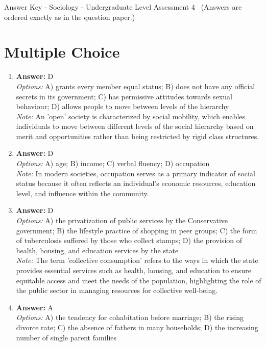\documentclass[12pt]{article}
\begin{document}
\begin{center}
Answer Key - Sociology - Undergraduate Level Assessment 4 \
\small (Answers are ordered exactly as in the question paper.)
\end{center}

\section*{Multiple Choice}
\begin{enumerate}[label=\arabic*.]
\item \textbf{Answer:} D
\\ \textit{Options:} A) grants every member equal status; B) does not have any official secrets in its government; C) has permissive attitudes towards sexual behaviour; D) allows people to move between levels of the hierarchy
\\ \textit{Note:} An 'open' society is characterized by social mobility, which enables individuals to move between different levels of the social hierarchy based on merit and opportunities rather than being restricted by rigid class structures.
\item \textbf{Answer:} D
\\ \textit{Options:} A) age; B) income; C) verbal fluency; D) occupation
\\ \textit{Note:} In modern societies, occupation serves as a primary indicator of social status because it often reflects an individual's economic resources, education level, and influence within the community.
\item \textbf{Answer:} D
\\ \textit{Options:} A) the privatization of public services by the Conservative government; B) the lifestyle practice of shopping in peer groups; C) the form of tuberculosis suffered by those who collect stamps; D) the provision of health, housing, and education services by the state
\\ \textit{Note:} The term 'collective consumption' refers to the ways in which the state provides essential services such as health, housing, and education to ensure equitable access and meet the needs of the population, highlighting the role of the public sector in managing resources for collective well-being.
\item \textbf{Answer:} A
\\ \textit{Options:} A) the tendency for cohabitation before marriage; B) the rising divorce rate; C) the absence of fathers in many households; D) the increasing number of single parent families

\end{enumerate}
\end{document}
